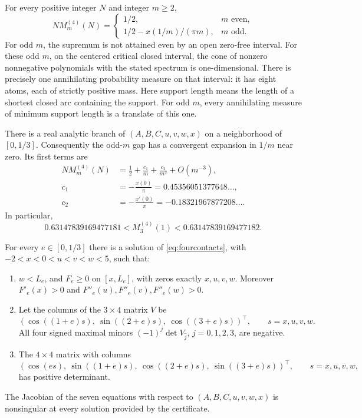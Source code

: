 \begin{theorem}\label{thm:four}
For every positive integer $N$ and integer $m\ge2$,
\[
 N M_m^{(4)}(N)=
 \begin{cases}
  1/2,&m\text{ even},\\[2pt]
  1/2-x(1/m)/(\pi m),&m\text{ odd}.
 \end{cases}
\]
For odd $m$, the supremum is not attained even by an open zero-free interval.
For these odd $m$, on the centered critical closed interval, the cone of nonzero nonnegative
polynomials with the stated spectrum is one-dimensional. There is precisely
one annihilating probability measure on that interval: it has eight atoms,
each of strictly positive mass. Here support length means the length of a shortest closed arc containing
the support. For odd $m$, every annihilating measure of minimum support length is a
translate of this one.

There is a real analytic branch of $(A,B,C,u,v,w,x)$ on a neighborhood of
$[0,1/3]$. Consequently the odd-$m$ gap has a convergent expansion in $1/m$
near zero. Its first terms are
\begin{align*}
 N M_m^{(4)}(N)&=\frac12+\frac{c_1}{m}+\frac{c_2}{m^2}+O(m^{-3}),\\
 c_1&=-\frac{x(0)}\pi=0.45356051377648\ldots,\\
 c_2&=-\frac{x'(0)}\pi=-0.18321967877208\ldots.
\end{align*}
In particular,
\[
 0.63147839169477181<M_3^{(4)}(1)<0.63147839169477182.
\]
\end{theorem}

\begin{lemma}\label{lem:fourcertificate}
For every $e\in[0,1/3]$ there is a solution of
\eqref{eq:fourcontacts}, with $-2<x<0<u<v<w<5$, such that:
\begin{enumerate}
\item $w<L_e$, and $F_e\ge0$ on $[x,L_e]$, with zeros exactly
$x,u,v,w$. Moreover $F'_e(x)>0$ and
$F''_e(u),F''_e(v),F''_e(w)>0$.
\item Let the columns of the $3\times4$ matrix $V$ be
\[
 (\cos((1+e)s),\ \sin((2+e)s),\ \cos((3+e)s))^\top,
 \qquad s=x,u,v,w.
\]
All four signed maximal minors $(-1)^j\det V_{\widehat j}$,
$j=0,1,2,3$, are negative.
\item The $4\times4$ matrix with columns
\[
 (\cos(es),\ \sin((1+e)s),\ \cos((2+e)s),\ \sin((3+e)s))^\top,
 \qquad s=x,u,v,w,
\]
has positive determinant.
\end{enumerate}
The Jacobian of the seven equations with respect to
$(A,B,C,u,v,w,x)$ is nonsingular at every solution provided by the certificate.
\end{lemma}

